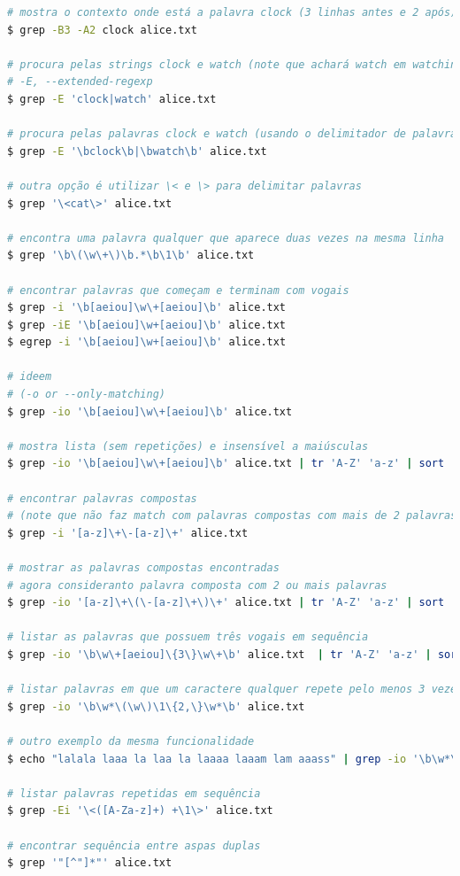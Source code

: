 \begin{frame}
\framebreak

\begin{lstlisting}[language=bash, label=lst-grep-06, caption={Contexto.}, postbreak=\mbox{$\hookrightarrow$\space}, basicstyle=\fontsize{8}{10}\selectfont\ttfamily]
# mostra o contexto onde está a palavra clock (3 linhas antes e 2 após)
$ grep -B3 -A2 clock alice.txt

# procura pelas strings clock e watch (note que achará watch em watching e watched)
# -E, --extended-regexp
$ grep -E 'clock|watch' alice.txt

# procura pelas palavras clock e watch (usando o delimitador de palavras \b)
$ grep -E '\bclock\b|\bwatch\b' alice.txt

# outra opção é utilizar \< e \> para delimitar palavras
$ grep '\<cat\>' alice.txt 

# encontra uma palavra qualquer que aparece duas vezes na mesma linha
$ grep '\b\(\w\+\)\b.*\b\1\b' alice.txt 

# encontrar palavras que começam e terminam com vogais
$ grep -i '\b[aeiou]\w\+[aeiou]\b' alice.txt
$ grep -iE '\b[aeiou]\w+[aeiou]\b' alice.txt 
$ egrep -i '\b[aeiou]\w+[aeiou]\b' alice.txt

# ideem
# (-o or --only-matching)
$ grep -io '\b[aeiou]\w\+[aeiou]\b' alice.txt

# mostra lista (sem repetições) e insensível a maiúsculas
$ grep -io '\b[aeiou]\w\+[aeiou]\b' alice.txt | tr 'A-Z' 'a-z' | sort | uniq

# encontrar palavras compostas
# (note que não faz match com palavras compostas com mais de 2 palavras)
$ grep -i '[a-z]\+\-[a-z]\+' alice.txt

# mostrar as palavras compostas encontradas
# agora consideranto palavra composta com 2 ou mais palavras
$ grep -io '[a-z]\+\(\-[a-z]\+\)\+' alice.txt | tr 'A-Z' 'a-z' | sort | uniq

# listar as palavras que possuem três vogais em sequência
$ grep -io '\b\w\+[aeiou]\{3\}\w\+\b' alice.txt  | tr 'A-Z' 'a-z' | sort | uniq

# listar palavras em que um caractere qualquer repete pelo menos 3 vezes
$ grep -io '\b\w*\(\w\)\1\{2,\}\w*\b' alice.txt

# outro exemplo da mesma funcionalidade
$ echo "lalala laaa la laa la laaaa laaam lam aaass" | grep -io '\b\w*\(\w\)\1\{2,\}\w*\b'

# listar palavras repetidas em sequência
$ grep -Ei '\<([A-Za-z]+) +\1\>' alice.txt 

# encontrar sequência entre aspas duplas
$ grep '"[^"]*"' alice.txt 
\end{lstlisting}


\end{frame}
